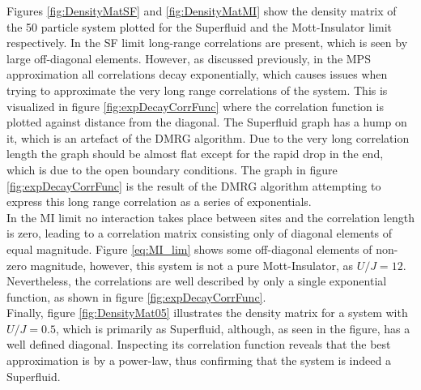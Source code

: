Figures \ref{fig:DensityMatSF} and \ref{fig:DensityMatMI} show the density matrix of the 50 particle system plotted for the Superfluid and the Mott-Insulator limit respectively. In the SF limit long-range correlations are present, which is seen by large off-diagonal elements. However, as discussed previously, in the MPS approximation all correlations decay exponentially, which causes issues when trying to approximate the very long range correlations of the system. This is visualized in figure \ref{fig:expDecayCorrFunc} where the correlation function is plotted against distance from the diagonal. The Superfluid graph has a hump on it, which is an artefact of the DMRG algorithm. Due to the very long correlation length the graph should be almost flat except for the rapid drop in the end, which is due to the open boundary conditions. The graph in figure \ref{fig:expDecayCorrFunc} is the result of the DMRG algorithm attempting to express this long range correlation as a series of exponentials.\\
In the MI limit no interaction takes place between sites and the correlation length is zero,  leading to a correlation matrix consisting only of diagonal elements of equal magnitude. Figure \eqref{eq:MI_lim} shows some off-diagonal elements of non-zero magnitude, however, this system is not a pure Mott-Insulator, as $U/J = 12$. Nevertheless, the correlations are well described by only a single exponential function, as shown in figure \ref{fig:expDecayCorrFunc}.\\
Finally, figure \ref{fig:DensityMat05} illustrates the density matrix for a system with $U/J = 0.5$, which is primarily as Superfluid, although, as seen in the figure, has a well defined diagonal. Inspecting its correlation function reveals that the best approximation is by a power-law, thus confirming that the system is indeed a Superfluid. 



